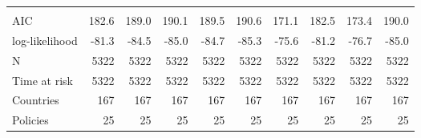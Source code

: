 \begin{tabular}{lrrrrrrrrr}
                                 &                   &                   &                   &                   &                   &                   &                   &                   &                   \\
AIC                              &             182.6 &             189.0 &             190.1 &             189.5 &             190.6 &             171.1 &             182.5 &             173.4 &             190.0 \\
log-likelihood                   &             -81.3 &             -84.5 &             -85.0 &             -84.7 &             -85.3 &             -75.6 &             -81.2 &             -76.7 &             -85.0 \\
N                                &              5322 &              5322 &              5322 &              5322 &              5322 &              5322 &              5322 &              5322 &              5322 \\
Time at risk                     &              5322 &              5322 &              5322 &              5322 &              5322 &              5322 &              5322 &              5322 &              5322 \\
Countries                        &               167 &               167 &               167 &               167 &               167 &               167 &               167 &               167 &               167 \\
Policies                         &                25 &                25 &                25 &                25 &                25 &                25 &                25 &                25 &                25 \\
\bottomrule
\end{tabular}
